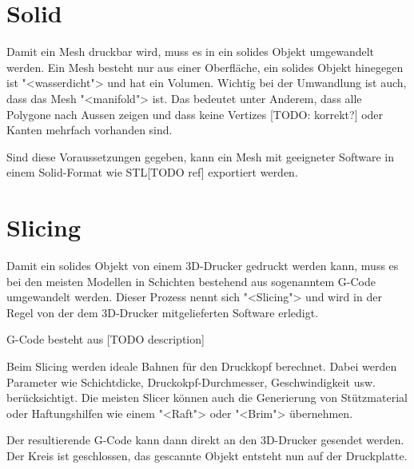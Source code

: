 \section{Solid}

Damit ein Mesh druckbar wird, muss es in ein solides Objekt umgewandelt werden.
Ein Mesh besteht nur aus einer Oberfläche, ein solides Objekt hinegegen ist
"<wasserdicht"> und hat ein Volumen. Wichtig bei der Umwandlung ist auch, dass
das Mesh "<manifold"> ist. Das bedeutet unter Anderem, dass alle Polygone nach
Aussen zeigen und dass keine Vertizes [TODO: korrekt?] oder Kanten mehrfach
vorhanden sind.

Sind diese Voraussetzungen gegeben, kann ein Mesh mit geeigneter Software in
einem Solid-Format wie STL[TODO ref] exportiert werden.


\section{Slicing}

Damit ein solides Objekt von einem 3D-Drucker gedruckt werden kann, muss es bei
den meisten Modellen in Schichten bestehend aus sogenanntem G-Code umgewandelt
werden. Dieser Prozess nennt sich "<Slicing"> und wird in der Regel von der dem
3D-Drucker mitgelieferten Software erledigt.

G-Code besteht aus [TODO description]

Beim Slicing werden ideale Bahnen für den Druckkopf berechnet. Dabei werden
Parameter wie Schichtdicke, Druckokpf-Durchmesser, Geschwindigkeit usw.
berücksichtigt. Die meisten Slicer können auch die Generierung von Stützmaterial
oder Haftungshilfen wie einem "<Raft"> oder "<Brim"> übernehmen.

Der resultierende G-Code kann dann direkt an den 3D-Drucker gesendet werden. Der
Kreis ist geschlossen, das gescannte Objekt entsteht nun auf der Druckplatte.
